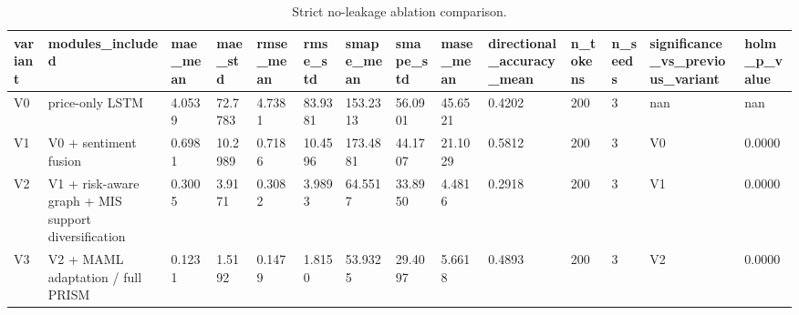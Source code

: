 \begin{table}[htbp]
\centering
\begin{tabular}{llllllllllllll}
\hline
variant & modules_included & mae_mean & mae_std & rmse_mean & rmse_std & smape_mean & smape_std & mase_mean & directional_accuracy_mean & n_tokens & n_seeds & significance_vs_previous_variant & holm_p_value \\
\hline
V0 & price-only LSTM & 4.0539 & 72.7783 & 4.7381 & 83.9381 & 153.2313 & 56.0901 & 45.6521 & 0.4202 & 200 & 3 & nan & nan \\
V1 & V0 + sentiment fusion & 0.6981 & 10.2989 & 0.7186 & 10.4596 & 173.4881 & 44.1707 & 21.1029 & 0.5812 & 200 & 3 & V0 & 0.0000 \\
V2 & V1 + risk-aware graph + MIS support diversification & 0.3005 & 3.9171 & 0.3082 & 3.9893 & 64.5517 & 33.8950 & 4.4816 & 0.2918 & 200 & 3 & V1 & 0.0000 \\
V3 & V2 + MAML adaptation / full PRISM & 0.1231 & 1.5192 & 0.1479 & 1.8150 & 53.9325 & 29.4097 & 5.6618 & 0.4893 & 200 & 3 & V2 & 0.0000 \\
\hline
\end{tabular}
\caption{Strict no-leakage ablation comparison.}
\label{table_ablation_strict}
\end{table}